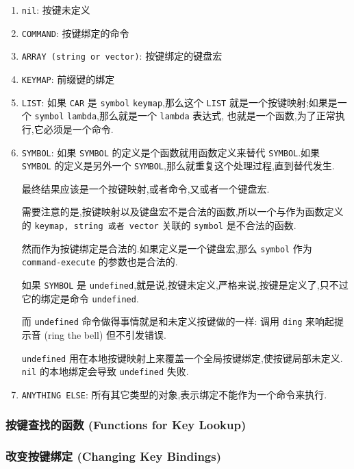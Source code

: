 \documentclass[11pt]{article}
\begin{document}
\begin{enumerate}
\item \texttt{nil}: 按键未定义
\item \texttt{COMMAND}: 按键绑定的命令
\item \texttt{ARRAY (string or vector)}: 按键绑定的键盘宏
\item \texttt{KEYMAP}: 前缀键的绑定
\item \texttt{LIST}: 如果 \texttt{CAR} 是 \texttt{symbol} \texttt{keymap},那么这个 \texttt{LIST} 就是一个按键映射;如果是一个 \texttt{symbol} \texttt{lambda},那么就是一个 \texttt{lambda} 表达式,
也就是一个函数,为了正常执行,它必须是一个命令.
\item \texttt{SYMBOL}: 如果 \texttt{SYMBOL} 的定义是个函数就用函数定义来替代 \texttt{SYMBOL}.如果 \texttt{SYMBOL} 的定义是另外一个 \texttt{SYMBOL},那么就重复这个处理过程,直到替代发生.

最终结果应该是一个按键映射,或者命令,又或者一个键盘宏.

需要注意的是,按键映射以及键盘宏不是合法的函数,所以一个与作为函数定义的 \texttt{keymap, string 或者 vector} 关联的 \texttt{symbol} 是不合法的函数.

然而作为按键绑定是合法的.如果定义是一个键盘宏,那么 \texttt{symbol} 作为 \texttt{command-execute} 的参数也是合法的.

如果 \texttt{SYMBOL} 是 \texttt{undefined},就是说,按键未定义,严格来说,按键是定义了,只不过它的绑定是命令 \texttt{undefined}.

而 \texttt{undefined} 命令做得事情就是和未定义按键做的一样: 调用 \texttt{ding} 来响起提示音 (ring the bell) 但不引发错误.

\texttt{undefined} 用在本地按键映射上来覆盖一个全局按键绑定,使按键局部未定义. \texttt{nil} 的本地绑定会导致 \texttt{undefined} 失败.
\item \texttt{ANYTHING ELSE}: 所有其它类型的对象,表示绑定不能作为一个命令来执行.
\end{enumerate}


\subsubsection{按键查找的函数 (Functions for Key Lookup)}
\label{sec:org08ca079}



\subsubsection{改变按键绑定 (Changing Key Bindings)}
\label{sec:org0f007b9}
\end{document}
